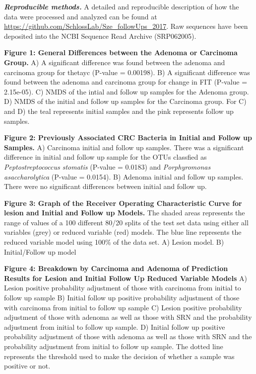 \documentclass[12pt,]{article}
\begin{document}
\textbf{\emph{Reproducible methods.}} A detailed and reproducible
description of how the data were processed and analyzed can be found at
\url{https://github.com/SchlossLab/Sze_followUps_2017}. Raw sequences
have been deposited into the NCBI Sequence Read Archive (SRP062005).

\newpage

\textbf{Figure 1: General Differences between the Adenoma or Carcinoma
Group.} A) A significant difference was found between the adenoma and
carcinoma group for thetayc (P-value = 0.00198). B) A significant
difference was found between the adenoma and carcinoma group for change
in FIT (P-value = 2.15e-05). C) NMDS of the intial and follow up samples
for the Adenoma group. D) NMDS of the initial and follow up samples for
the Carcinoma group. For C) and D) the teal represents initial samples
and the pink represents follow up samples.

\textbf{Figure 2: Previously Associated CRC Bacteria in Initial and
Follow up Samples.} A) Carcinoma initial and follow up samples. There
was a significant difference in initial and follow up sample for the
OTUs classfied as \emph{Peptostreptococcus stomatis} (P-value = 0.0183)
and \emph{Porphyromonas asaccharolytica} (P-value = 0.0154). B) Adenoma
initial and follow up samples. There were no significant differences
between initial and follow up.

\textbf{Figure 3: Graph of the Receiver Operating Characteristic Curve
for lesion and Initial and Follow up Models.} The shaded areas
represents the range of values of a 100 different 80/20 splits of the
test set data using either all variables (grey) or reduced variable
(red) models. The blue line represents the reduced variable model using
100\% of the data set. A) Lesion model. B) Initial/Follow up model

\textbf{Figure 4: Breakdown by Carcinoma and Adenoma of Prediction
Results for Lesion and Initial Follow Up Reduced Variable Models} A)
Lesion positive probability adjustment of those with carcinoma from
initial to follow up sample B) Initial follow up positive probability
adjustment of those with carcinoma from initial to follow up sample C)
Lesion positive probability adjustment of those with adenoma as well as
those with SRN and the probability adjustment from initial to follow up
sample. D) Initial follow up positive probability adjustment of those
with adenoma as well as those with SRN and the probability adjustment
from initial to follow up sample. The dotted line represents the
threshold used to make the decision of whether a sample was positive or
not.
\end{document}
